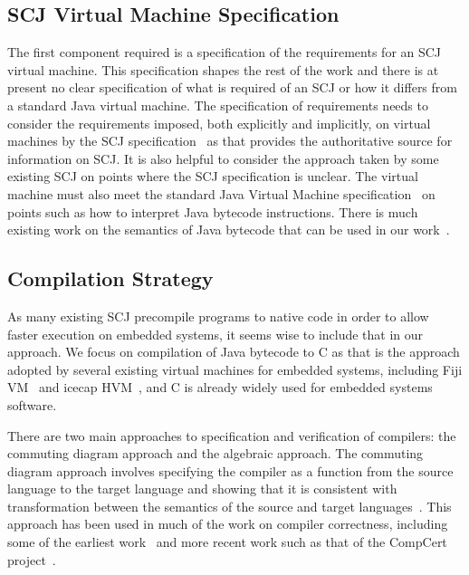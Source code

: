 \subsection{SCJ Virtual Machine Specification}

The first component required is a specification of the requirements
for an SCJ virtual machine.
This specification shapes the rest of the work and there is at present
no clear specification of what is required of an
SCJ or how it differs from a
standard Java virtual machine.
The specification of requirements needs to consider the requirements
imposed, both explicitly and implicitly, on virtual machines by the
SCJ specification~\cite{locke2013} as that provides the authoritative
source for information on SCJ.
It is also helpful to consider the approach taken by some existing
SCJ on points where the SCJ
specification is unclear.
The virtual machine must also meet the standard Java Virtual Machine
specification~\cite{lindholm2014} on points such as how to interpret
Java bytecode instructions.
There is much existing work on the semantics of Java bytecode that can
be used in our work~\cite{bertelsen2000, jones1998, stark2001}.

\subsection{Compilation Strategy}

As many existing SCJ
precompile programs to native code in order to allow faster execution
on embedded systems, it seems wise to include that in our approach.
We focus on compilation of Java bytecode to C as that is the approach
adopted by several existing virtual machines for embedded systems,
including Fiji VM~\cite{pizlo2009} and icecap
HVM~\cite{sondergaard2012}, and C is already widely used for embedded
systems software.

There are two main approaches to specification and verification of
compilers: the commuting diagram approach and the algebraic approach.
The commuting diagram approach involves specifying the compiler as a
function from the source language to the target language and showing
that it is consistent with transformation between the semantics of the
source and target languages~\cite{morris1973, thatcher1979}.
This approach has been used in much of the work on compiler
correctness, including some of the earliest work~\cite{mccarthy1967}
and more recent work such as that of the CompCert project~\cite{leroy2009a,
  leroy2009b}.

